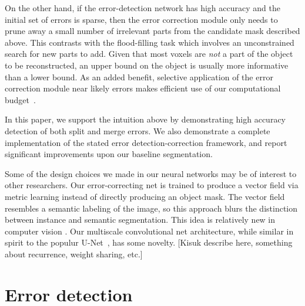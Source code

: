 \documentclass{article}
\begin{document}
On the other hand, if the error-detection network has high accuracy and the initial set of errors is sparse, then the error correction module only needs to prune away a small number of irrelevant parts from the candidate mask described above. This contrasts with the flood-filling task which involves an unconstrained search for new parts to add. Given that most voxels are \textit{not} a part of the object to be reconstructed, an upper bound on the object is usually more informative than a lower bound. As an added benefit, selective application of the error correction module near likely errors makes efficient use of our computational budget~\cite{multipass}.

In this paper, we support the intuition above by demonstrating high accuracy detection of both split and merge errors. We also demonstrate a complete implementation of the stated error detection-correction framework, and report significant improvements upon our baseline segmentation.


Some of the design choices we made in our neural networks may be of interest to other researchers. Our error-correcting net is trained to produce a vector field via metric learning instead of directly producing an object mask. The vector field resembles a semantic labeling of the image, so this approach blurs the distinction between instance and semantic segmentation. This idea is relatively new in computer vision \cite{harley2015metric,fathi2017metric,brabandere2017metric}. Our multiscale convolutional net architecture, while similar in spirit to the populur U-Net~\cite{unet}, has some novelty.  [Kisuk describe here, something about recurrence, weight sharing, etc.]

\section{Error detection}
\end{document}
